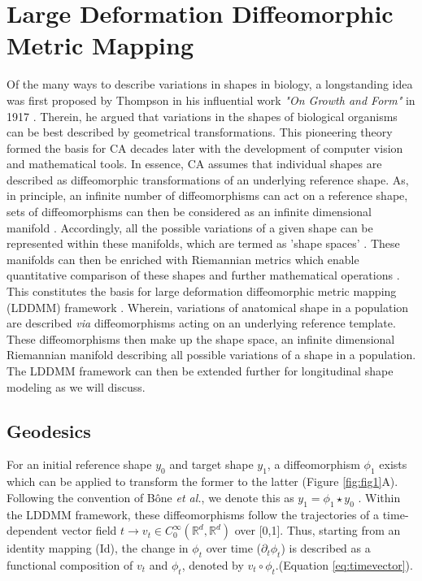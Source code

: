\section{Large Deformation Diffeomorphic Metric Mapping}
\label{sec:LDDMM}

	Of the many ways to describe variations in shapes in biology, a longstanding idea was first proposed by Thompson in his influential work \textit{"On Growth and Form"} in 1917 \cite{Thompson_1992}. Therein, he argued that variations in the shapes of biological organisms can be best described by geometrical transformations. This pioneering theory formed the basis for CA decades later with the development of computer vision and mathematical tools. In essence, CA assumes that individual shapes are described as diffeomorphic transformations of an underlying reference shape. As, in principle, an infinite number of diffeomorphisms can act on a reference shape, sets of diffeomorphisms can then be considered as an infinite dimensional manifold \cite{Marsland2020}. Accordingly, all the possible variations of a given shape can be represented within these manifolds, which are termed as 'shape spaces' \cite{Kendall1984, Monteiro2000, Rohlf2000}. These manifolds can then be enriched with Riemannian metrics which enable quantitative comparison of these shapes and further mathematical operations \cite{Younes2010, Miller2002, Miller2004}. This constitutes the basis for large deformation diffeomorphic metric mapping (LDDMM) framework \cite{Glauns2008, Durrleman2014}. Wherein, variations of anatomical shape in a population are described \textit{via} diffeomorphisms acting on an underlying reference template. These diffeomorphisms then make up the shape space, an infinite dimensional Riemannian manifold describing all possible variations of a shape in a population. The LDDMM framework can then be extended further for longitudinal shape modeling as we will discuss.  

		\subsection{Geodesics}
		
		For an initial reference shape $y_{0}$ and target shape $y_{1}$, a diffeomorphism $\phi_{1}$ exists which can be applied to transform the former to the latter (Figure \ref{fig:fig1}A). Following the convention of Bône \textit{et al.}, we denote this as $y_{1} = \phi_{1} \star y_{0}$ \cite{Bne2020}. Within the LDDMM framework, these diffeomorphisms follow the trajectories of a time-dependent vector field $t \rightarrow v_{t} \in C_{0}^{\infty} (\mathbb{R}^{d}, \mathbb{R}^{d})$ over [0,1]. Thus, starting from an identity mapping (Id), the change in $\phi_{t}$ over time ($\partial _{t} \phi_{t}$) is described as a functional composition of $v_{t}$ and $\phi_{t}$, denoted by $v_{t} \circ \phi_{t}$.(Equation \ref{eq:timevector}).
		
